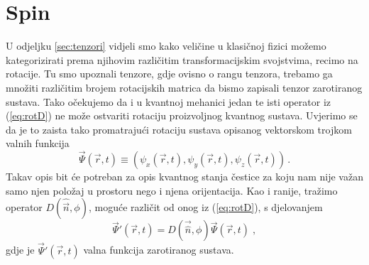 \section{Spin}

U odjeljku \ref{sec:tenzori} vidjeli smo kako veličine u klasičnoj fizici
možemo kategorizirati prema njihovim različitim transformacijskim svojstvima,
recimo na rotacije. Tu smo upoznali tenzore, gdje ovisno o rangu tenzora,
trebamo ga množiti različitim brojem rotacijskih matrica da bismo zapisali
tenzor zarotiranog sustava. Tako očekujemo da i u kvantnoj mehanici jedan
te isti operator
iz (\ref{eq:rotD}) ne može ostvariti
rotaciju proizvoljnog kvantnog sustava.
Uvjerimo se da je to zaista tako
promatrajući rotaciju sustava opisanog vektorskom trojkom valnih funkcija
\begin{equation}
  \vec{\Psi}(\vec{r},t) \equiv (\psi_{x}(\vec{r}, t),
 \psi_{y}(\vec{r}, t), \psi_{z}(\vec{r}, t)) \,.
 \label{eq:psitrojka}
\end{equation}
Takav opis bit će potreban za opis kvantnog stanja čestice za koju nam nije
važan samo njen položaj u prostoru nego i njena orijentacija.
Kao i ranije, tražimo operator $D(\hat{\vec{n}}, \phi)$, moguće
različit od onog iz (\ref{eq:rotD}), s djelovanjem
\begin{equation}
  \vec{\Psi}'(\vec{r},t) = D
(\vec{\hat{n}},\phi) \vec{\Psi}(\vec{r},t) \;,
\end{equation}
gdje je $\vec{\Psi}'(\vec{r},t)$ valna funkcija zarotiranog sustava.

\centerline{}

